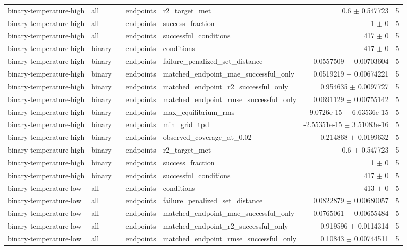 \begin{tabular}{lllllrr}
binary-temperature-high & all &  & endpoints & r2_target_met & 0.6 $\pm$ 0.547723 & 5 \\
binary-temperature-high & all &  & endpoints & success_fraction & 1 $\pm$ 0 & 5 \\
binary-temperature-high & all &  & endpoints & successful_conditions & 417 $\pm$ 0 & 5 \\
binary-temperature-high & binary &  & endpoints & conditions & 417 $\pm$ 0 & 5 \\
binary-temperature-high & binary &  & endpoints & failure_penalized_set_distance & 0.0557509 $\pm$ 0.00703604 & 5 \\
binary-temperature-high & binary &  & endpoints & matched_endpoint_mae_successful_only & 0.0519219 $\pm$ 0.00674221 & 5 \\
binary-temperature-high & binary &  & endpoints & matched_endpoint_r2_successful_only & 0.954635 $\pm$ 0.0097727 & 5 \\
binary-temperature-high & binary &  & endpoints & matched_endpoint_rmse_successful_only & 0.0691129 $\pm$ 0.00755142 & 5 \\
binary-temperature-high & binary &  & endpoints & max_equilibrium_rms & 9.0726e-15 $\pm$ 6.63536e-15 & 5 \\
binary-temperature-high & binary &  & endpoints & min_grid_tpd & -2.55351e-15 $\pm$ 3.51083e-16 & 5 \\
binary-temperature-high & binary &  & endpoints & observed_coverage_at_0.02 & 0.214868 $\pm$ 0.0199632 & 5 \\
binary-temperature-high & binary &  & endpoints & r2_target_met & 0.6 $\pm$ 0.547723 & 5 \\
binary-temperature-high & binary &  & endpoints & success_fraction & 1 $\pm$ 0 & 5 \\
binary-temperature-high & binary &  & endpoints & successful_conditions & 417 $\pm$ 0 & 5 \\
binary-temperature-low & all &  & endpoints & conditions & 413 $\pm$ 0 & 5 \\
binary-temperature-low & all &  & endpoints & failure_penalized_set_distance & 0.0822879 $\pm$ 0.00680057 & 5 \\
binary-temperature-low & all &  & endpoints & matched_endpoint_mae_successful_only & 0.0765061 $\pm$ 0.00655484 & 5 \\
binary-temperature-low & all &  & endpoints & matched_endpoint_r2_successful_only & 0.919596 $\pm$ 0.0114314 & 5 \\
binary-temperature-low & all &  & endpoints & matched_endpoint_rmse_successful_only & 0.10843 $\pm$ 0.00744511 & 5 \\

\end{tabular}
